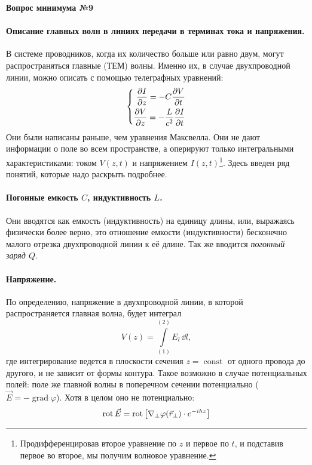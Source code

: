 \documentclass[a4paper,14pt]{extarticle}
\DeclareMathOperator{\Rot}{rot}
\DeclareMathOperator{\Grad}{grad}
\DeclareMathOperator{\const}{const}
\renewcommand{\phi}{\varphi}
\newcommand{\ticket}[1] {
\newpage
\hypertarget{num#1}{}
\begin{center}
	\textbf{Вопрос минимума №#1 }
\end{center}
}
\begin{document}
\ticket{9}
\paragraph{Описание главных волн в линиях передачи в терминах тока и напряжения. } В системе проводников, когда их количество больше или равно двум, могут распространяться главные (ТЕМ) волны. Именно их, в случае двухпроводной линии, можно описать с помощью телеграфных уравнений:
\begin{equation}
	\left\{\begin{aligned}
		\pdv{I}{z} = -C\pdv{V}{t}\\
		\pdv{V}{z} = -\frac{L}{c^2} \pdv{I}{t}
	\end{aligned}\right.
\end{equation}
Они были написаны раньше, чем уравнения Максвелла. Они не дают информации о поле во всем пространстве, а оперируют только интегральными характеристиками: током $V(z,t)$ и напряжением $I(z,t)$\footnote{Продифференцировав второе уравнение по $z$ и первое по $t$, и подставив первое во второе, мы получим волновое уравнение.}.
Здесь введен ряд понятий, которые надо раскрыть подробнее.

\paragraph{Погонные емкость $C$, индуктивность $L$.} Они вводятся как емкость (индуктивность) на единицу длины, или, выражаясь физически более верно, это отношение емкости (индуктивности) бесконечно малого отрезка двухпроводной линии к её длине. Так же вводится \textit{погонный заряд $Q$}.

\paragraph{Напряжение. } По определению, напряжение в двухпроводной линии, в которой распространяется главная волна, будет интеграл
\begin{equation}
	V(z) = \int\limits_{(1)}^{(2)} E_l\, \dd l,
\end{equation}
где интегрирование ведется в плоскости сечения $z=\const$ от одного провода до другого, и не зависит от формы контура. Такое возможно в случае потенциальных полей: поле же главной волны в поперечном сечении потенциально ($\vec{E}=-\Grad \phi$). Хотя в целом оно не потенциально:
\begin{equation}
	\Rot \vec{E} = \Rot\qty[
		\nabla_\perp \phi(\vec{r}_\perp)\cdot e^{-ihz}
	]
\end{equation}
\end{document}
